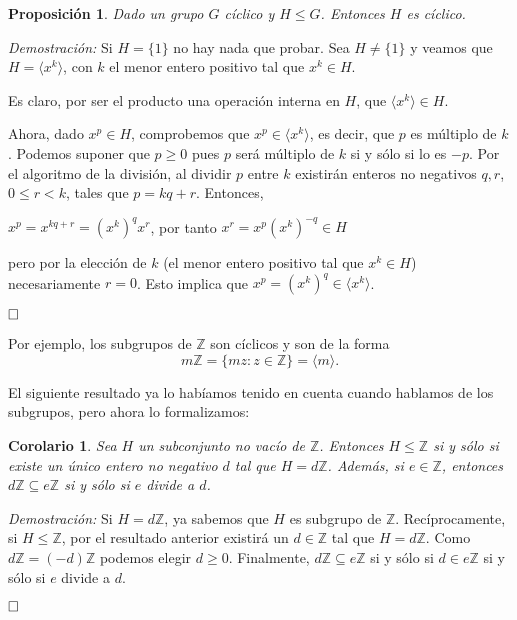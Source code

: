 \documentclass[12pt]{article}
\newtheorem{proposition}[theorem]{Proposición}
\newtheorem{corolario}{Corolario}[theorem]
\begin{document}
\begin{proposition}\label{eq:subciclico} Dado un grupo $G$ cíclico y $H \leq G$. Entonces $H$ es cíclico.
\end{proposition}
\emph{Demostración: } Si $H = \lbrace 1 \rbrace$ no hay nada que probar. Sea $H \neq \lbrace 1 \rbrace$ y veamos que $H = \langle x^{k} \rangle$, con $k$ el menor entero positivo tal que $x^{k} \in H$.

Es claro, por ser el producto una operación interna en $H$, que $\langle x^{k} \rangle \in H$.

Ahora, dado $x ^{p} \in H$, comprobemos que $x^{p} \in \langle x^{k} \rangle$, es decir, que $p$ es múltiplo de $k$. Podemos suponer que $p \geq 0$ pues $p$ será múltiplo de $k$ si y sólo si lo es $-p$. Por el algoritmo de la división, al dividir $p$ entre $k$ existirán enteros no negativos $q,r$, $0 \leq r < k$, tales que $p = kq + r$. Entonces, 
\begin{center}
$x^{p} = x^{kq+r} = (x^{k})^{q}x^{r}$, por tanto $x^{r} = x^{p}(x^{k})^{-q} \in H$
\end{center}
pero por la elección de $k$ (el menor entero positivo tal que $x^{k} \in H$) necesariamente $r = 0$. Esto implica que $x^{p} = (x^{k})^{q} \in \langle x^{k} \rangle$.

$\hfill \square$

Por ejemplo, los subgrupos de $\mathbb{Z}$ son cíclicos y son de la forma $$m\mathbb{Z} = \lbrace mz : z \in \mathbb{Z} \rbrace = \langle m \rangle.$$

El siguiente resultado ya lo habíamos tenido en cuenta cuando hablamos de los subgrupos, pero ahora lo formalizamos:

\begin{corolario}Sea $H$ un subconjunto no vacío de $\mathbb{Z}$. Entonces $H \leq \mathbb{Z}$ si y sólo si existe un único entero no negativo $d$ tal que $H = d\mathbb{Z}$. Además, si $e \in \mathbb{Z}$, entonces $d\mathbb{Z} \subseteq e\mathbb{Z}$ si y sólo si $e$ divide a $d$.
\end{corolario}
\emph{Demostración: }Si $H = d\mathbb{Z}$, ya sabemos que $H$ es subgrupo de $\mathbb{Z}$. Recíprocamente, si $H \leq \mathbb{Z}$, por el resultado anterior existirá un $d \in \mathbb{Z}$ tal que $H = d\mathbb{Z}$. Como $d\mathbb{Z} = (-d)\mathbb{Z}$ podemos elegir $d \geq 0$. Finalmente, $d\mathbb{Z} \subseteq e\mathbb{Z}$ si y sólo si $d \in e\mathbb{Z}$ si y sólo si $e$ divide a $d$.

$\hfill \square$
\end{document}
